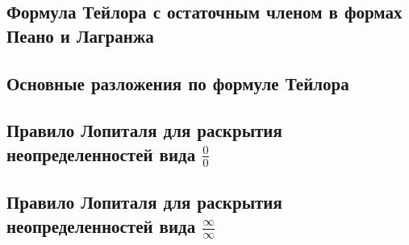 \documentclass{article}
\begin{document}
    \subsection*{Формула Тейлора с остаточным членом в формах Пеано и Лагранжа}
    \subsection*{Основные разложения по формуле Тейлора}
    \subsection*{Правило Лопиталя для раскрытия неопределенностей вида $\frac{0}{0}$}
    \subsection*{Правило Лопиталя для раскрытия неопределенностей вида $\frac{\infty}{\infty}$} 
\end{document}
